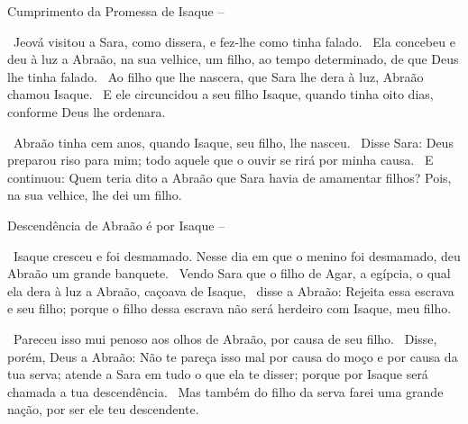 \documentclass[12pt,aspectratio=169]{beamer}
\newcommand{\ver}[1]{%
    \raisebox{0.50ex}{%
        \scalebox{1.1}{%
            \pmb{\textbf{\textcolor{BSpbg}{#1}}}%
        }%
    }%
}
\newcommand{\QUOTE}[1]{%
    \par\noindent\hspace*{0.05\linewidth}%
    \begin{minipage}{0.9\linewidth}%
        \linespread{1.35}\large{#1}%
    \end{minipage}%
}
\newcommand{\RED}[1]{{\textcolor{TXred}{#1}}}
\newcommand{\ORA}[1]{{\textcolor{TXred!50!TXyel}{#1}}}
\newcommand{\YEL}[1]{{\textcolor{TXyel}{#1}}}
\newcommand{\GRE}[1]{{\textcolor{TXgre}{#1}}}
\newcommand{\BLU}[1]{{\textcolor{TXblu}{#1}}}
\newcommand{\MAG}[1]{{\textcolor{TXmag}{#1}}}
\newcommand{\BRI}[1]{{\textcolor{BSpbg}{#1}}}   %
\begin{document}
    \begin{frame}[allowframebreaks]{Cumprimento da Promessa de \YEL{Isaque} --}
        \QUOTE{%
            \ver{Gn 21.1}~Jeová \BRI{visitou} a Sara, \MAG{como dissera}, e \BRI{fez}-lhe
            \MAG{como tinha falado}.
            \ver{2}~Ela concebeu e deu à luz a Abraão, na sua velhice, um filho, \MAG{ao tempo
            determinado}, de que \BLU{Deus} lhe tinha \BLU{falado}.
            \ver{3}~Ao filho que lhe nascera, que Sara lhe dera à luz, Abraão chamou
            \YEL{Isaque}.
            \ver{4}~E ele \YEL{circuncidou} a seu filho Isaque, quando tinha \YEL{oito dias},
            \YEL{conforme Deus lhe ordenara}.
        }

        \pagebreak

        \QUOTE{%
            \ver{5}~Abraão tinha \GRE{cem anos}, quando Isaque, seu filho, lhe nasceu.
            \ver{6}~Disse Sara: Deus preparou \GRE{riso} para mim; todo aquele que o ouvir se
            rirá por minha causa.
            \ver{7}~E continuou: \BLU{Quem} teria dito a Abraão que Sara havia de amamentar
            filhos?  Pois, na sua velhice, lhe dei um filho.
        }
    \end{frame}

    \begin{frame}[allowframebreaks]{Descendência de Abraão é por \YEL{Isaque} --}
        \QUOTE{%
            \ver{Gn 21.8}~Isaque cresceu e foi \BRI{desmamado}. Nesse dia em que o menino foi
            desmamado, deu Abraão um grande banquete.
            \ver{9}~Vendo Sara que o filho de Agar, a egípcia, o qual ela dera à luz a Abraão,
            \RED{caçoava} de Isaque,
            \ver{10}~disse a Abraão: Rejeita essa escrava e seu filho; \ORA{porque o filho dessa
            escrava não será herdeiro com Isaque, meu filho}.
        }

        \pagebreak

        \QUOTE{%
            \ver{11}~Pareceu isso mui penoso aos olhos de Abraão, por causa de seu filho.
            \ver{12}~Disse, porém, Deus a Abraão: Não te pareça isso mal por causa do moço e por
            causa da tua serva; \YEL{atende a Sara} em tudo o que ela te disser; porque \YEL{por
            Isaque será chamada a tua descendência}.
            \ver{13}~Mas também do filho da serva \ORA{farei uma grande nação, por ser ele teu
            descendente}.
        }
    \end{frame}
\end{document}
